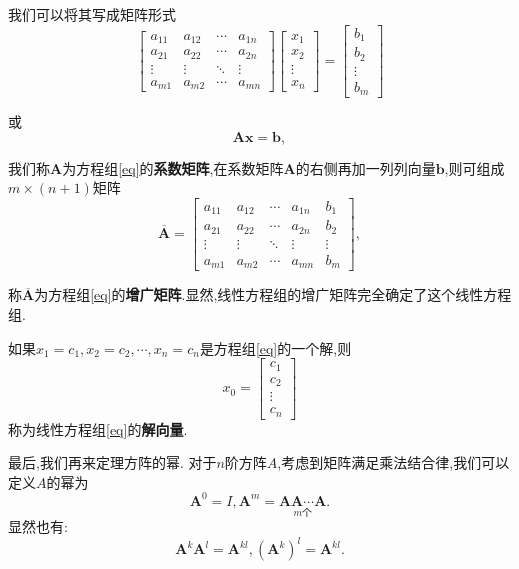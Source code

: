 我们可以将其写成矩阵形式
\[
	\begin{bmatrix}
		a_{11} & a_{12} & \cdots & a_{1n} \\
		a_{21} & a_{22} & \cdots & a_{2n} \\
		\vdots & \vdots & \ddots & \vdots \\
		a_{m1} & a_{m2} & \cdots & a_{mn}
	\end{bmatrix}
	\begin{bmatrix}
		x_{1}  \\
		x_{2}  \\
		\vdots \\
		x_{n}
	\end{bmatrix}
	=\begin{bmatrix}
		b_{1}  \\
		b_{2}  \\
		\vdots \\
		b_{m}
	\end{bmatrix}
\]

或
\begin{equation}
	\mathbf{Ax=b},
\end{equation}

我们称$\mathbf{A}$为方程组\eqref{eq}的\textbf{系数矩阵},在系数矩阵$\mathbf{A}$的右侧再加一列列向量$\mathbf{b}$,则可组成$m\times(n+1)$矩阵
\[
	\overline{\mathbf{A}}=
	\begin{bmatrix}
		a_{11} & a_{12} & \cdots & a_{1n} & b_1    \\
		a_{21} & a_{22} & \cdots & a_{2n} & b_2    \\
		\vdots & \vdots & \ddots & \vdots & \vdots \\
		a_{m1} & a_{m2} & \cdots & a_{mn} & b_m
	\end{bmatrix} ,
\]

称$\overline{\mathbf{A}}$为方程组\eqref{eq}的\textbf{增广矩阵}.显然,线性方程组的增广矩阵完全确定了这个线性方程组.

如果$x_1=c_1,x_2=c_2,\cdots,x_n=c_n$是方程组\eqref{eq}的一个解,则
\[
	x_0=\begin{bmatrix}
		c_{1}  \\
		c_{2}  \\
		\vdots \\
		c_{n}
	\end{bmatrix}
\]
称为线性方程组\eqref{eq}的\textbf{解向量}.

最后,我们再来定理方阵的幂.
对于$n$阶方阵$A$,考虑到矩阵满足乘法结合律,我们可以定义$A$的幂为
\[
	\mathbf{A}^0=I,\mathbf{A}^m=\underset{m\text{个}}{\mathbf{A}\mathbf{A}\cdots \mathbf{A}}.\]
显然也有:
\[
	\mathbf{A}^k\mathbf{A}^l=\mathbf{A}^{kl},(\mathbf{A}^k)^l=\mathbf{A}^{kl}.
\]

